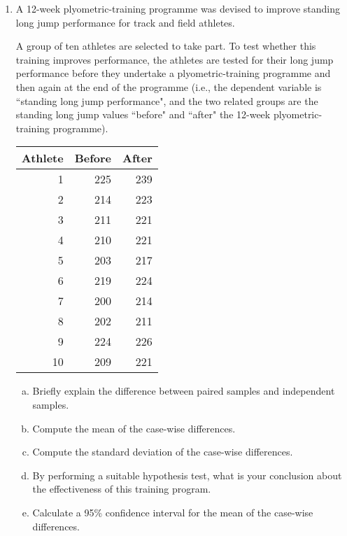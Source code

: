 \documentclass[a4paper,12pt]{article}
\begin{document}
\begin{enumerate}

 
\item A 12-week plyometric-training programme was devised to improve standing long jump performance for track and field athletes.

A group of ten athletes are selected to take part. To test whether this training improves performance, the athletes are tested for their long jump performance
 before they undertake a plyometric-training programme and then again at the end of the programme 
(i.e., the dependent variable is ``standing long jump performance", and the two related groups are the standing long jump values ``before" and ``after" the 12-week plyometric-training programme).

\begin{table}[ht]
\centering
\begin{tabular}{|r|r|r|}
  \hline
 Athlete & Before & After \\ 
  \hline
1 & 225 & 239 \\ 
  2 & 214 & 223 \\ 
  3 & 211 & 221 \\ 
  4 & 210 & 221 \\ 
  5 & 203 & 217 \\ 
  6 & 219 & 224 \\ 
  7 & 200 & 214 \\ 
  8 & 202 & 211 \\ 
  9 & 224 & 226 \\ 
  10 & 209 & 221 \\ 
   \hline
\end{tabular}
\end{table}

\begin{enumerate}[(a)]
\item  Briefly explain the difference between paired samples and independent samples.
\item Compute the mean of the case-wise differences.
\item Compute the standard deviation of the case-wise differences.
\item By performing a suitable hypothesis test, what is your conclusion about the effectiveness of this training program. 
\item Calculate a 95\% confidence interval for the mean of the case-wise differences.

\end{enumerate}


\end{enumerate}
\end{document}
